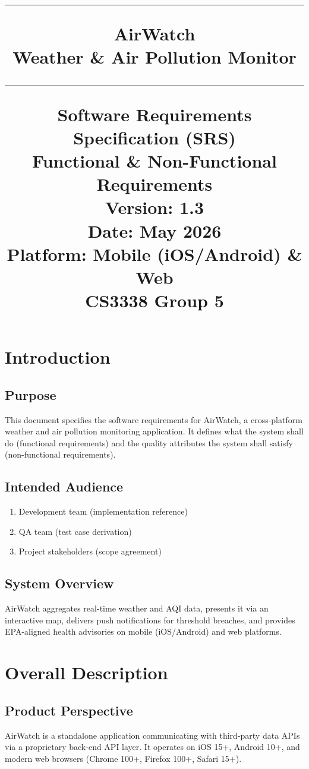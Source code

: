 \documentclass[12pt]{article}
\title{\noindent\rule{\textwidth}{0.5pt}
\huge{AirWatch} \vspace{0.1cm}\\ \large{Weather \& Air Pollution Monitor\\}
\noindent\rule{\textwidth}{0.5pt}
\Large{Software Requirements Specification (SRS)\\\small{Functional \& Non-Functional Requirements\\}}
\vspace{0.1cm}
\small{ 
Version: 1.3\\ 
Date: May 2026\\
Platform: Mobile (iOS/Android) \& Web\\
CS3338 Group  5}
}
\date{}
\begin{document}
\maketitle
\tableofcontents
\newpage

\section{Introduction}

\subsection{Purpose}
This document specifies the software requirements for AirWatch, a cross-platform weather and air pollution monitoring application. It defines what the system shall do (functional requirements) and the quality attributes the system shall satisfy (non-functional requirements).

\subsection{Intended Audience}
\begin{enumerate}
    \item Development team (implementation reference)
    \item QA team (test case derivation)
    \item Project stakeholders (scope agreement)
\end{enumerate}

\subsection{System Overview}
AirWatch aggregates real-time weather and AQI data, presents it via an interactive map, delivers push notifications for threshold breaches, and provides EPA-aligned health advisories on mobile (iOS/Android) and web platforms.

\section{Overall Description}

\subsection{Product Perspective}
AirWatch is a standalone application communicating with third-party data APIs via a proprietary back-end API layer. It operates on iOS 15+, Android 10+, and modern web browsers (Chrome 100+, Firefox 100+, Safari 15+).
\end{document}
